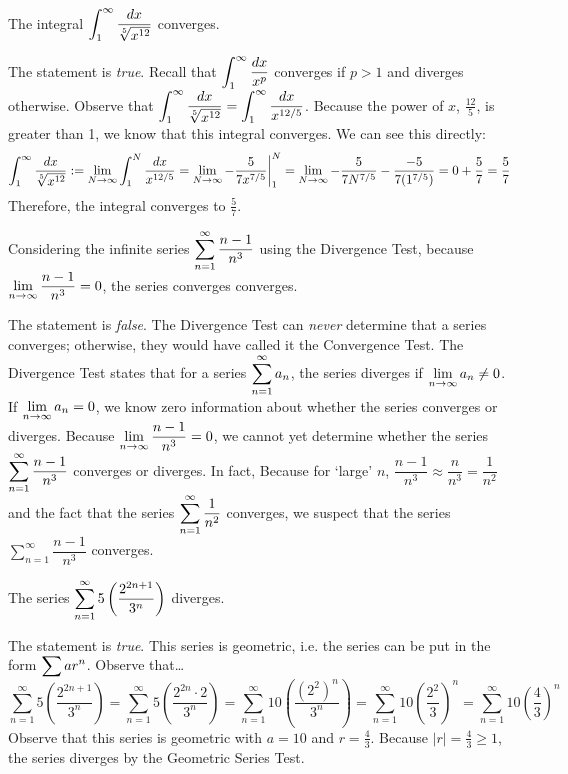 \documentclass[11pt,letterpaper]{article}
\begin{document}
\newpage



 The integral $\displaystyle\int_1^\infty \dfrac{dx}{\sqrt[5]{x^{12}}}$ converges. \pspace

\sol The statement is \textit{true}. Recall that $\displaystyle\int_1^\infty \dfrac{dx}{x^p}$ converges if $p > 1$ and diverges otherwise. Observe that $\displaystyle \int_1^\infty \dfrac{dx}{\sqrt[5]{x^{12}}}= \int_1^\infty \dfrac{dx}{x^{12/5}}$. Because the power of $x$, $\frac{12}{5}$, is greater than 1, we know that this integral converges. We can see this directly:
	\[
	\displaystyle\int_1^\infty \dfrac{dx}{\sqrt[5]{x^{12}}}:= \lim_{N \to \infty} \int_1^N \dfrac{dx}{x^{12/5}}= \lim_{N \to \infty} -\dfrac{5}{7x^{7/5}} \bigg|_1^N= \lim_{N \to \infty} -\dfrac{5}{7 N^{7/5}} - \dfrac{-5}{7(1^{7/5})}= 0 + \dfrac{5}{7}= \dfrac{5}{7}
	\]
Therefore, the integral converges to $\frac{5}{7}$. \pvspace{1.3cm}



 Considering the infinite series $\displaystyle\sum_{n=1}^\infty \dfrac{n - 1}{n^3}$ using the Divergence Test, because $\displaystyle\lim_{n \to \infty} \dfrac{n - 1}{n^3}= 0$, the series converges converges. \pspace

\sol The statement is \textit{false}. The Divergence Test can \textit{never} determine that a series converges; otherwise, they would have called it the Convergence Test. The Divergence Test states that for a series $\displaystyle\sum_{n=1}^\infty a_n$, the series diverges if $\displaystyle\lim_{n \to \infty} a_n \neq 0$. If $\displaystyle\lim_{n \to \infty} a_n= 0$, we know zero information about whether the series converges or diverges. Because $\displaystyle\lim_{n \to \infty} \dfrac{n - 1}{n^3}= 0$, we cannot yet determine whether the series $\displaystyle\sum_{n=1}^\infty \dfrac{n - 1}{n^3}$ converges or diverges. In fact, Because for `large' $n$, $\dfrac{n - 1}{n^3} \approx \dfrac{n}{n^3}= \dfrac{1}{n^2}$ and the fact that the series $\displaystyle\sum_{n=1}^\infty \dfrac{1}{n^2}$ converges, we suspect that the series $\sum_{n=1}^\infty \dfrac{n - 1}{n^3}$ converges. \pvspace{1.3cm}



 The series $\displaystyle\sum_{n=1}^\infty 5 \left( \dfrac{2^{2n+1}}{3^n} \right)$ diverges. \pspace

\sol The statement is \textit{true}. This series is geometric, i.e. the series can be put in the form $\displaystyle\sum a r^n$. Observe that\dots
	\[
	\sum_{n=1}^\infty 5 \left( \dfrac{2^{2n+1}}{3^n} \right)= \sum_{n=1}^\infty 5 \left( \dfrac{2^{2n} \cdot 2}{3^n} \right)= \sum_{n=1}^\infty 10 \left( \dfrac{(2^2)^n}{3^n} \right)= \sum_{n=1}^\infty 10 \left( \dfrac{2^2}{3} \right)^n= \sum_{n=1}^\infty 10 \left( \dfrac{4}{3} \right)^n
	\]
Observe that this series is geometric with $a= 10$ and $r= \frac{4}{3}$. Because $|r|= \frac{4}{3} \geq 1$, the series diverges by the Geometric Series Test. \pvspace{1.3cm}
\end{document}
